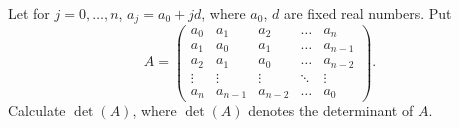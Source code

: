 \documentclass{article}
\begin{document}
	\setlength{\parindent}{0pt}
	Let for $j=0,\dots,n$, $a_j=a_0+jd$, where $a_0$, $d$ are fixed real numbers. Put
	$$A=\begin{pmatrix}
		a_0&a_1&a_2&\dots&a_n\\
		a_1&a_0&a_1&\dots&a_{n-1}\\
		a_2&a_1&a_0&\dots&a_{n-2}\\
		\vdots&\vdots&\vdots&\ddots&\vdots\\
		a_n&a_{n-1}&a_{n-2}&\dots&a_0
	\end{pmatrix}.$$
	Calculate $\det(A)$, where $\det(A)$ denotes the determinant of $A$.
\end{document}
